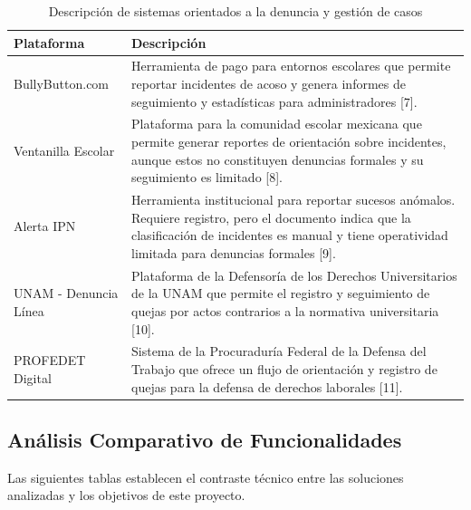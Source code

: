         \begin{table}[h]
        \centering
        \caption{Descripción de sistemas orientados a la denuncia y gestión de casos}
        \label{tab:estado-arte}
        \begin{tabular}{|p{3cm}|p{9.5cm}|}
            \hline
            \textbf{Plataforma} & \textbf{Descripción} \\
            \hline
            BullyButton.com & Herramienta de pago para entornos escolares que permite reportar incidentes de acoso y genera informes de seguimiento y estadísticas para administradores [7]. \\
            \hline
            Ventanilla Escolar & Plataforma para la comunidad escolar mexicana que permite generar reportes de orientación sobre incidentes, aunque estos no constituyen denuncias formales y su seguimiento es limitado [8]. \\
            \hline
            Alerta IPN & Herramienta institucional para reportar sucesos anómalos. Requiere registro, pero el documento indica que la clasificación de incidentes es manual y tiene operatividad limitada para denuncias formales [9]. \\
            \hline
            UNAM - Denuncia Línea & Plataforma de la Defensoría de los Derechos Universitarios de la UNAM que permite el registro y seguimiento de quejas por actos contrarios a la normativa universitaria [10]. \\
            \hline
            PROFEDET Digital & Sistema de la Procuraduría Federal de la Defensa del Trabajo que ofrece un flujo de orientación y registro de quejas para la defensa de derechos laborales [11]. \\
            \hline
        \end{tabular}
        \end{table}

        \subsection{Análisis Comparativo de Funcionalidades}
            
            Las siguientes tablas establecen el contraste técnico entre las soluciones analizadas y los objetivos de este proyecto.
            
